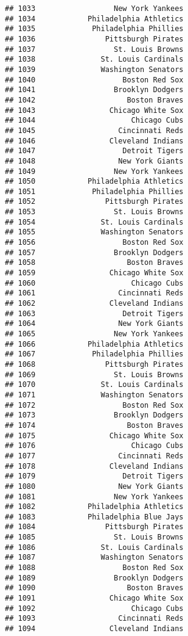 \documentclass[]{article}
\begin{document}
\begin{verbatim}
## 1033                  New York Yankees
## 1034            Philadelphia Athletics
## 1035             Philadelphia Phillies
## 1036                Pittsburgh Pirates
## 1037                  St. Louis Browns
## 1038               St. Louis Cardinals
## 1039               Washington Senators
## 1040                    Boston Red Sox
## 1041                  Brooklyn Dodgers
## 1042                     Boston Braves
## 1043                 Chicago White Sox
## 1044                      Chicago Cubs
## 1045                   Cincinnati Reds
## 1046                 Cleveland Indians
## 1047                    Detroit Tigers
## 1048                   New York Giants
## 1049                  New York Yankees
## 1050            Philadelphia Athletics
## 1051             Philadelphia Phillies
## 1052                Pittsburgh Pirates
## 1053                  St. Louis Browns
## 1054               St. Louis Cardinals
## 1055               Washington Senators
## 1056                    Boston Red Sox
## 1057                  Brooklyn Dodgers
## 1058                     Boston Braves
## 1059                 Chicago White Sox
## 1060                      Chicago Cubs
## 1061                   Cincinnati Reds
## 1062                 Cleveland Indians
## 1063                    Detroit Tigers
## 1064                   New York Giants
## 1065                  New York Yankees
## 1066            Philadelphia Athletics
## 1067             Philadelphia Phillies
## 1068                Pittsburgh Pirates
## 1069                  St. Louis Browns
## 1070               St. Louis Cardinals
## 1071               Washington Senators
## 1072                    Boston Red Sox
## 1073                  Brooklyn Dodgers
## 1074                     Boston Braves
## 1075                 Chicago White Sox
## 1076                      Chicago Cubs
## 1077                   Cincinnati Reds
## 1078                 Cleveland Indians
## 1079                    Detroit Tigers
## 1080                   New York Giants
## 1081                  New York Yankees
## 1082            Philadelphia Athletics
## 1083            Philadelphia Blue Jays
## 1084                Pittsburgh Pirates
## 1085                  St. Louis Browns
## 1086               St. Louis Cardinals
## 1087               Washington Senators
## 1088                    Boston Red Sox
## 1089                  Brooklyn Dodgers
## 1090                     Boston Braves
## 1091                 Chicago White Sox
## 1092                      Chicago Cubs
## 1093                   Cincinnati Reds
## 1094                 Cleveland Indians

\end{verbatim}
\end{document}
